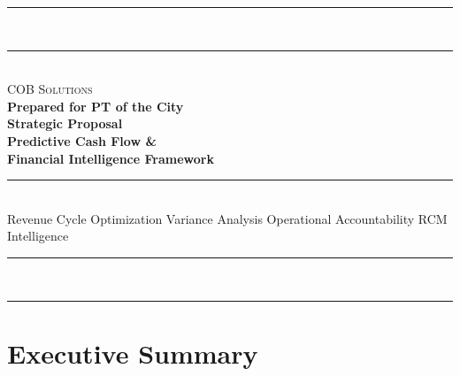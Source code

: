 \documentclass[11pt,a4paper]{article}
\begin{document}

\begin{titlepage}
\pagecolor{PrimaryBlue}\color{white}
\vspace*{0.6cm}
\begin{center}
  \textcolor{AccentGold}{\rule{0.88\linewidth}{2pt}}\\[0.3em]
  \textcolor{AccentGold}{\rule{0.88\linewidth}{0.5pt}}\\[1.4cm]

  {\fontsize{14}{18}\selectfont\color{SoftBlue}\textsc{COB Solutions}}\\[0.4em]
  {\fontsize{12}{16}\selectfont\color{AccentGold}\textbf{Prepared for PT of the City}}\\[1.2cm]

  {\fontsize{28}{36}\selectfont\bfseries Strategic Proposal}\\[0.3em]
  {\fontsize{20}{28}\selectfont\bfseries Predictive Cash Flow \&}\\[0.1em]
  {\fontsize{20}{28}\selectfont\bfseries Financial Intelligence Framework}\\[0.8em]

  \textcolor{AccentGold}{\rule{0.5\linewidth}{0.8pt}}\\[0.6em]
  {\color{SoftBlue}\small
    Revenue Cycle Optimization \textbullet{} Variance Analysis \textbullet{}
    Operational Accountability \textbullet{} RCM Intelligence}\\[2.0cm]


  \vfill
  \textcolor{AccentGold}{\rule{0.88\linewidth}{0.5pt}}\\[0.3em]
  \textcolor{AccentGold}{\rule{0.88\linewidth}{2pt}}
\end{center}
\end{titlepage}
\nopagecolor\color{black}

\newpage
\tableofcontents
\newpage

\section{Executive Summary}
\end{document}
